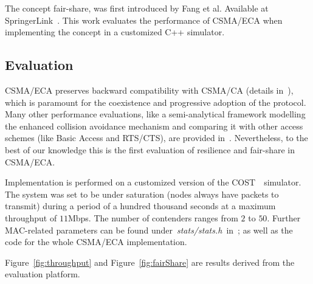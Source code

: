The concept fair-share, was first introduced by Fang et al. Available at SpringerLink~\cite{L_MAC2}. This work evaluates the performance of CSMA/ECA when implementing the concept in a customized C++ simulator.


\subsection*{Evaluation}
CSMA/ECA preserves backward compatibility with CSMA/CA (details in~\cite{CSMA_ECA, HE}), which is paramount for the coexistence and progressive adoption of the protocol. Many other performance evaluations, like a semi-analytical framework modelling the enhanced collision avoidance mechanism and comparing it with other access schemes (like Basic Access and RTS/CTS), are provided in~\cite{E2CA_performance}. Nevertheless, to the best of our knowledge this is the first evaluation of resilience and fair-share in CSMA/ECA.

Implementation is performed on a customized version of the COST~\cite{COST}~simulator. The system was set to be under saturation (nodes always have packets to transmit) during a period of a hundred thousand seconds at a maximum throughput of $11$Mbps. The number of contenders ranges from $2$ to $50$. Further MAC-related parameters can be found under~\emph{stats/stats.h}~in~\cite{sim:parameters}; as well as the code for the whole CSMA/ECA implementation.

Figure~\ref{fig:throughput} and Figure~\ref{fig:fairShare} are results derived from the evaluation platform.